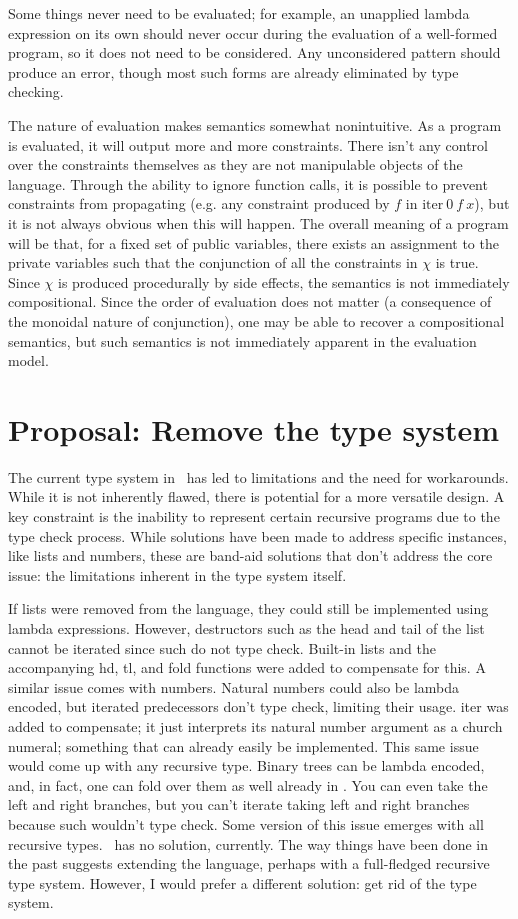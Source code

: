 \documentclass[
    9pt,            %
    techreport,        %
    affiltop,       %
]{art}
\begin{document}
Some things never need to be evaluated; for example, an unapplied lambda expression on its own should never occur during the evaluation of a well-formed program, so it does not need to be considered. Any unconsidered pattern should produce an error, though most such forms are already eliminated by type checking.

The nature of evaluation makes semantics somewhat nonintuitive. As a program is evaluated, it will output more and more constraints. There isn't any control over the constraints themselves as they are not manipulable objects of the language. Through the ability to ignore function calls, it is possible to prevent constraints from propagating (e.g. any constraint produced by $f$ in $\text{iter}\ 0\ f\ x$), but it is not always obvious when this will happen. The overall meaning of a program will be that, for a fixed set of public variables, there exists an assignment to the private variables such that the conjunction of all the constraints in $\chi$ is true. Since $\chi$ is produced procedurally by side effects, the semantics is not immediately compositional. Since the order of evaluation does not matter (a consequence of the monoidal nature of conjunction), one may be able to recover a compositional semantics, but such semantics is not immediately apparent in the evaluation model.

\section{Proposal: Remove the type system}

The current type system in \VampIR{}\ has led to limitations and the need for workarounds. While it is not inherently flawed, there is potential for a more versatile design. A key constraint is the inability to represent certain recursive programs due to the type check process. While solutions have been made to address specific instances, like lists and numbers, these are band-aid solutions that don't address the core issue: the limitations inherent in the type system itself. 

If lists were removed from the language, they could still be implemented using lambda expressions. However, destructors such as the head and tail of the list cannot be iterated since such do not type check. Built-in lists and the accompanying hd, tl, and fold functions were added to compensate for this. A similar issue comes with numbers. Natural numbers could also be lambda encoded, but iterated predecessors don't type check, limiting their usage. iter was added to compensate; it just interprets its natural number argument as a church numeral; something that can already easily be implemented. This same issue would come up with any recursive type. Binary trees can be lambda encoded, and, in fact, one can fold over them as well already in \VampIR{}. You can even take the left and right branches, but you can't iterate taking left and right branches because such wouldn't type check. Some version of this issue emerges with all recursive types. \VampIR{}\ has no solution, currently. The way things have been done in the past suggests extending the language, perhaps with a full-fledged recursive type system. However, I would prefer a different solution: get rid of the type system.
\end{document}
